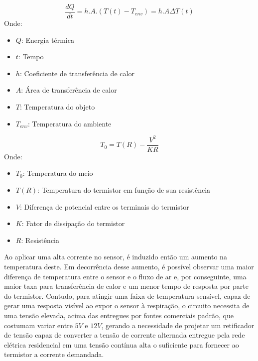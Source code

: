   
\begin{equation} \label{eq:resfriamento}
	\dfrac{dQ}{dt} = h.A.(T(t) - T_{env}) = h.A \Delta T(t)	
\end{equation}
Onde:
\begin{itemize}[label=]
	\item $Q$: Energia térmica
	\item $t$: Tempo
	\item $h$: Coeficiente de transferência de calor
	\item $A$: Área de transferência de calor
	\item $T$: Temperatura do objeto
	\item $T_{env}$: Temperatura do ambiente
\end{itemize}
 
\begin{equation} \label{eq:autoAquecimento}
	T_0 = T(R) - \dfrac{V^2}{KR}
\end{equation}
Onde:
\begin{itemize}[label=]
	\item $T_0$: Temperatura do meio
 	\item $T(R)$: Temperatura do termistor em função de sua resistência
 	\item $V$: Diferença de potencial entre os terminais do termistor
 	\item $K$: Fator de dissipação do termistor
 	\item $R$: Resistência
\end{itemize}
 
 
 
Ao aplicar uma alta corrente no sensor, é induzido então um aumento na temperatura deste. Em decorrência desse aumento, é possível observar uma maior diferença de temperatura entre o sensor e o fluxo de ar e, por conseguinte, uma maior taxa para transferência de calor e um menor tempo de resposta por parte do termistor. Contudo, para atingir uma faixa de temperatura sensível, capaz de gerar uma resposta visível ao expor o sensor à respiração, o circuito necessita de uma tensão elevada, acima das entregues por fontes comerciais padrão, que costumam variar entre $5V$ e $12V$, gerando a necessidade de projetar um retificador de tensão capaz de converter a tensão de corrente alternada entregue pela rede elétrica residencial em uma tensão contínua alta o suficiente para fornecer ao termistor a corrente demandada.
 
